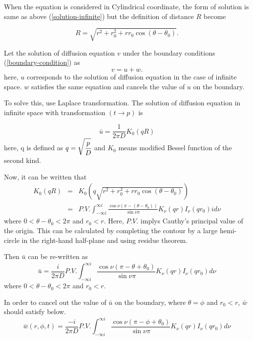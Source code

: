\documentclass{article}
\begin{document}
When the equation is considered in Cylindrical coordinate, the form of solution
is same as above (\ref{solution-infinite}) but the definition of distance $R$ become

\begin{equation}
    R = \sqrt{r^2+r_0^2+rr_0\cos(\theta - \theta_0)}.
\end{equation}

Let the solution of diffusion equation $v$ under the boundary conditions
 (\ref{boundary-condition}) as
\begin{equation}
    v = u + w.
\end{equation}
here, $u$ corresponds to the solution of diffusion equation in the case of
 infinite space. $w$ satisfies the same equation and cancels the value of $u$ on
 the boundary.

To solve this, use Laplace transformation.
 The solution of diffusion equation in infinite space with transformation
 $(t\rightarrow p)$ is

\begin{equation} \label{Laplace-u-solution-infinite}
    \bar{u} = \frac{1}{2\pi D}K_0(qR)
\end{equation}
here, q is defined as $q = \sqrt{\cfrac{p}{D}}$ and $K_0$ means modified Bessel
 function of the second kind.

Now, it can be written that
\begin{eqnarray}
    K_0(qR) &=& K_0\left(q\sqrt{r^2+r_0^2+rr_0\cos(\theta - \theta_0)}\right) \nonumber \\
            &=& P.V.\int^{\infty i}_{-\infty i}
                \frac{\cos\nu (\pi - (\theta - \theta_0 ))}{\sin\nu\pi}
                K_\nu(qr)I_\nu(qr_0)id\nu\label{expansion-K0}
\end{eqnarray}
where $0 < \theta - \theta_0 < 2\pi$ and $r_0 < r$.
 Here, $P.V.$ implys Cauthy's principal value of the origin.
 This can be calculated by completing the contour by a large hemi-circle
 in the right-hand half-plane and using residue theorem.

Then $\bar{u}$ can be re-written as
\begin{equation}\label{expansion-bar-u}
    \bar{u} = \frac{i}{2\pi D}P.V.\int^{\infty i}_{-\infty i}
              \frac{\cos\nu (\pi - \theta + \theta_0)}{\sin\nu\pi}
              K_\nu(qr)I_\nu(qr_0)d\nu
\end{equation}
where $0 < \theta - \theta_0 < 2\pi$ and $r_0 < r$.

In order to cancel out the value of $\bar{u}$ on the boundary,
 where $\theta = \phi$ and $r_0 < r$, $\bar{w}$ should satisfy below.
\begin{equation}
    \bar{w}(r, \phi, t) =
              \frac{-i}{2\pi D}P.V.\int^{\infty i}_{-\infty i}
              \frac{\cos\nu (\pi - \phi + \theta_0)}{\sin\nu\pi}
              K_\nu(qr)I_\nu(qr_0)d\nu
\end{equation}
\end{document}
